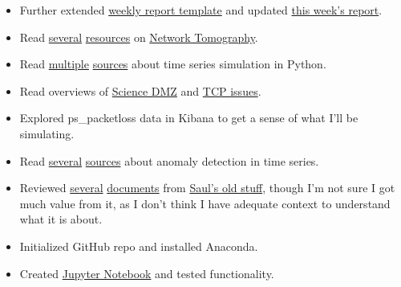 \documentclass{weeklyreport}
\begin{document}
\begin{itemize}
    \item Further extended \href{https://www.overleaf.com/8647266712ttkyxfphmtvs}{weekly report template} and updated \href{https://www.overleaf.com/2136625242fmfmybmnxbsh
}{this week's report}. 
    \item Read \href{https://netbeez.net/blog/network-tomography/}{several} \href{https://en.wikipedia.org/wiki/Network_tomography}{resources} on \href{https://www.cc.gatech.edu/~dovrolis/Courses/8803_F03/christos.pdf}{Network Tomography}.
    \item Read \href{https://www.oreilly.com/library/view/practical-time-series/9781492041641/ch04.html}{multiple} \href{https://adgefficiency.com/defaultdict/}{sources} about time series simulation in Python.
    \item Read overviews of \href{http://fasterdata.es.net/science-dmz/}{Science DMZ} and \href{http://fasterdata.es.net/network-tuning/tcp-issues-explained/}{TCP issues}.
    \item Explored ps\_packetloss data in Kibana to get a sense of what I'll be simulating.
    \item Read \href{https://towardsdatascience.com/anomaly-detection-with-time-series-forecasting-c34c6d04b24a}{several} \href{https://medium.com/pinterest-engineering/building-a-real-time-anomaly-detection-system-for-time-series-at-pinterest-a833e6856ddd}{sources} about anomaly detection in time series.
    \item Reviewed \href{http://egg.bu.edu/atlas/studies\%7btype:egg.Hatch\%7d/WAN-talk-SCW/WAN-4-ADC.pdf}{several} \href{http://egg.bu.edu/LHC\%7Binf:LHC\%7D/gadget:FTS/section:history/fts/docs/update-2015-06-09/FTS-update.pdf}{documents} from \href{http://egg.bu.edu/LHC\%7Binf:LHC\%7D/gadget:FTS/section:history/fts/index.htm}{Saul's old stuff}, though I'm not sure I got much value from it, as I don't think I have adequate context to understand what it is about.
    \item Initialized GitHub repo and installed Anaconda.
    \item Created \href{https://edrisq.codas.slateci.net/}{Jupyter Notebook} and tested functionality.
\end{itemize}

\subsection*{}
\end{document}
